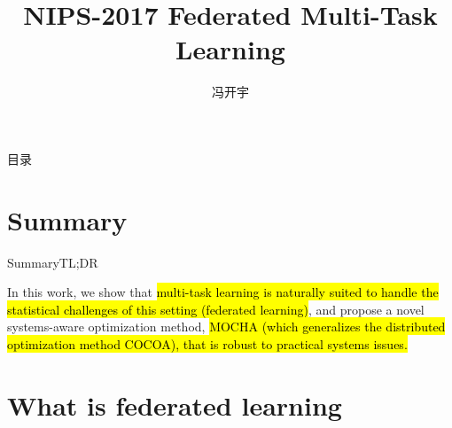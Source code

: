 \documentclass[UTF8,aspectratio=169,presentation]{ctexbeamer}
\makeatletter
\let\HL\hl
\renewcommand\hl{%
  \let\set@color\beamerorig@set@color
  \let\reset@color\beamerorig@reset@color
  \HL}
\makeatother
\begin{document}
\title{NIPS-2017 Federated Multi-Task Learning}
\author{冯开宇}
\date{\zhtoday}
\frame{\titlepage}




%
\begin{frame}{目录}
  \tableofcontents[hideallsubsections]
\end{frame}

%
\section{Summary}    %


\begin{frame}{Summary}{TL;DR}

  In this work, we show that \hl{multi-task learning is naturally suited to handle the statistical challenges of this setting (federated learning)}, and propose a novel systems-aware optimization method, \hl{MOCHA (which generalizes the distributed optimization method COCOA), that is robust to practical systems issues.}

\end{frame}

\section{What is federated learning}    %

\newcommand{\eg}{e.g.\@\xspace}
\end{document}
